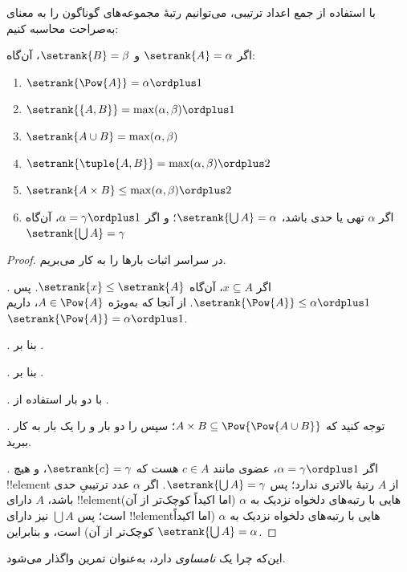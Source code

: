 \documentclass[../../../include/open-logic-section]{subfiles}
\begin{document}

با استفاده از جمع اعداد ترتیبی، می‌توانیم رتبهٔ مجموعه‌های گوناگون
را به معنای  به‌صراحت محاسبه کنیم:

\begin{lem}
اگر $\setrank{A} = \alpha$ و $\setrank{B} = \beta$، آن‌گاه:
\begin{enumerate}
	\item{} $\setrank{\Pow{A}} = \alpha\ordplus 1$
	\item{} $\setrank{\{A, B\}} = \max(\alpha,
	\beta) \ordplus 1$
	\item{} $\setrank{A \cup B} = \max(\alpha,
	\beta)$
	\item{} $\setrank{\tuple{A,B}} = \max(\alpha,
	\beta) \ordplus  2$
	\item{} $\setrank{A \times B} \leq \max(\alpha,
	\beta) \ordplus  2$
	\item{} اگر $\alpha$ تهی یا حدی باشد،
	$\setrank{\bigcup A} = \alpha$؛ و اگر
	$\alpha = \gamma\ordplus 1$، آن‌گاه
	$\setrank{\bigcup A} = \gamma$
\end{enumerate}
\end{lem}

\begin{proof}
در سراسر اثبات بارها
 را به کار می‌بریم.

\emph{.} اگر $x \subseteq A$، آن‌گاه
$\setrank{x} \leq \setrank{A}$. پس
$\setrank{\Pow{A}} \leq \alpha \ordplus 1$. از آنجا که به‌ویژه
$A \in \Pow{A}$، داریم
$\setrank{\Pow{A}} = \alpha \ordplus 1$.

\emph{.} بنا بر
.

\emph{.} بنا بر
.

\emph{.} با دو بار استفاده از
.

\emph{.} توجه کنید که
$A \times B \subseteq \Pow{\Pow{A \cup B}}$؛ سپس
 را دو بار و  را یک بار به کار
ببرید.

\emph{.} اگر $\alpha = \gamma\ordplus 1$، عضوی
مانند $c \in A$ هست که $\setrank{c} = \gamma$، و هیچ
!!{element} از $A$ رتبهٔ بالاتری ندارد؛ پس
$\setrank{\bigcup A} = \gamma$. اگر $\alpha$ عدد ترتیبیِ حدی باشد،
$A$ دارای !!{element}هایی با رتبه‌های دلخواه نزدیک به $\alpha$
(اما اکیداً کوچک‌تر از آن) است؛ پس $\bigcup A$ نیز دارای
!!{element}هایی با رتبه‌های دلخواه نزدیک به $\alpha$ (اما اکیداً
کوچک‌تر از آن) است، و بنابراین
$\setrank{\bigcup A} = \alpha$.
\end{proof}
\noindent
این‌که چرا  یک \emph{نامساوی} دارد، به‌عنوان
تمرین واگذار می‌شود.
\end{document}
